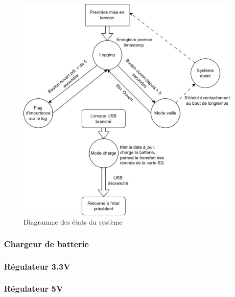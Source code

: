 {{		\clearpage
		\begin{figure}[th]
			\centering
			\includegraphics[width=1.1\linewidth]{Figures/Dev-SCH/Etats_diagramme}
			\caption{Diagramme des états du système}
			\label{fig:etatsdiagramme}
		\end{figure}
		
	}

	\clearpage
	\subsubsection{Chargeur de batterie} \label{sssec:BatCharger}
	{
		
	}
	
	\subsubsection{Régulateur 3.3V} \label{sssec:Reg3V3}
	{
		
	}
	
	\subsubsection{Régulateur 5V} \label{sssec:Reg5V}
	{
		
	}
	

}

\clearpage